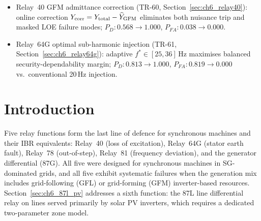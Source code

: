 \begin{itemize}
  \item[\textbf{C14.}] Relay~40 GFM admittance correction (TR-60,
    Section~\ref{sec:ch6_relay40}): online correction $Y_{\rm corr} =
    Y_{\rm total} - \widehat{Y}_{\rm GFM}$ eliminates both nuisance trip and
    masked LOE failure modes; $P_D: 0.568 \to 1.000$, $P_{FA}: 0.038 \to 0.000$.

  \item[\textbf{C15.}] Relay~64G optimal sub-harmonic injection (TR-61,
    Section~\ref{sec:ch6_relay64g}): adaptive $f^* \in [25, 36]\,\text{Hz}$
    maximises balanced security-dependability margin; $P_D: 0.813 \to 1.000$,
    $P_{FA}: 0.819 \to 0.000$ vs.\ conventional 20\,Hz injection.
\end{itemize}

\section{Introduction}
\label{sec:ch6_intro}

Five relay functions form the last line of defence for synchronous machines and
their IBR equivalents: Relay~40 (loss of excitation), Relay~64G (stator earth
fault), Relay~78 (out-of-step), Relay~81 (frequency deviation), and the
generator differential (87G).
All five were designed for synchronous machines in SG-dominated grids, and all
five exhibit systematic failures when the generation mix includes grid-following
(GFL) or grid-forming (GFM) inverter-based resources.
Section~\ref{sec:ch6_87l_pv} addresses a sixth function: the 87L line
differential relay on lines served primarily by solar PV inverters, which
requires a dedicated two-parameter zone model.

